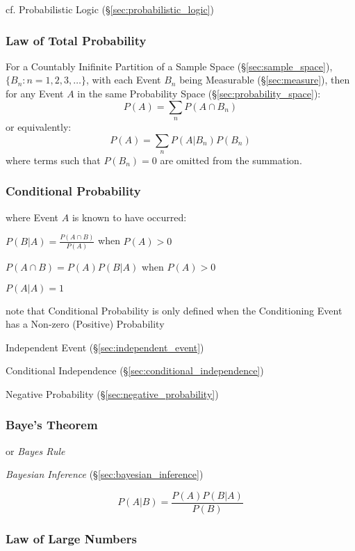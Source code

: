 \fist cf. Probabilistic Logic (\S\ref{sec:probabilistic_logic})



\subsubsection{Law of Total Probability}\label{sec:total_probability}

For a Countably Inifinite Partition of a Sample Space
(\S\ref{sec:sample_space}), $\{ B_n : n = 1,2,3,\ldots \}$, with each
Event $B_n$ being Measurable (\S\ref{sec:measure}), then for any Event
$A$ in the same Probability Space (\S\ref{sec:probability_space}):
\[
  P(A) = \sum_n P(A \cap B_n)
\]
or equivalently:
\[
  P(A) = \sum_n P(A|B_n) P(B_n)
\]
where terms such that $P(B_n) = 0$ are omitted from the summation.



\subsubsection{Conditional Probability}
\label{sec:conditional_probability}

where Event $A$ is known to have occurred:

$P(B|A) = \frac{P(A \cap B)}{P(A)}$ when $P(A) > 0$

$P(A \cap B) = P(A) P(B|A)$ when $P(A) > 0$

$P(A|A) = 1$

note that Conditional Probability is only defined when the Conditioning Event
has a Non-zero (Positive) Probability

\fist Independent Event (\S\ref{sec:independent_event})

\fist Conditional Independence (\S\ref{sec:conditional_independence})

\fist Negative Probability (\S\ref{sec:negative_probability})



\subsubsection{Baye's Theorem}\label{sec:bayes_theorem}

or \emph{Bayes Rule}

\emph{Bayesian Inference} (\S\ref{sec:bayesian_inference})

\[
  P(A|B) = \frac{P(A)P(B|A)}{P(B)}
\]



\subsubsection{Law of Large Numbers}\label{sec:large_numbers}

